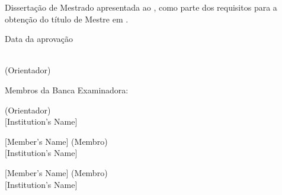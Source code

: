 \begingroup

\begin{center}
\authorname

\vspace{1.5cm}

\doctitlebrazilian
\end{center}

\vspace{2cm}

\begin{flushright}
\begin{minipage}{.5\textwidth}
Dissertação de Mestrado apresentada ao \universityfull, como parte dos requisitos para a obtenção do título de 
Mestre em \knowledgearea.

\vspace{2cm}

Data da aprovação \signaturedate

\vspace{2cm}

\hrulefill\\
\supervisor\space(Orientador)\\
\universityfull
\end{minipage}
\end{flushright}

\vspace{1.0 cm}

\begin{flushleft}
Membros da Banca Examinadora:

\supervisor\space(Orientador)\\
{[}Institution's Name{]}

[Member's Name] (Membro)\\
{[}Institution's Name{]}

[Member's Name] (Membro)\\
{[}Institution's Name{]}
\end{flushleft}

\endgroup
